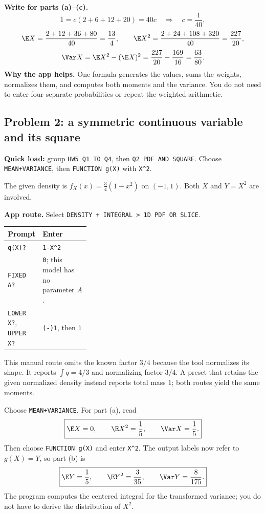 \textbf{Write for parts (a)--(c).}
\[
1=c(2+6+12+20)=40c\quad\Rightarrow\quad c=\frac1{40},
\]
\[
\E X=\frac{2+12+36+80}{40}=\frac{13}{4},\qquad
\E X^2=\frac{2+24+108+320}{40}=\frac{227}{20},
\]
\[
\Var X=\E X^2-(\E X)^2=\frac{227}{20}-\frac{169}{16}=\frac{63}{80}.
\]
\textbf{Why the app helps.} One formula generates the values, sums the weights, normalizes them, and computes both moments and the variance. You do not need to enter four separate probabilities or repeat the weighted arithmetic.

\subsection{Problem 2: a symmetric continuous variable and its square}
\textbf{Quick load:} group \texttt{HW5 Q1 TO Q4}, then \texttt{Q2 PDF AND SQUARE}. Choose \texttt{MEAN+VARIANCE}, then \texttt{FUNCTION g(X)} with \texttt{X\^{}2}.

The given density is $f_X(x)=\frac34(1-x^2)$ on $(-1,1)$. Both $X$ and $Y=X^2$ are involved.

\textbf{App route.} Select \texttt{DENSITY + INTEGRAL > 1D PDF OR SLICE}.
\begin{center}
\begin{tabularx}{\linewidth}{@{}p{0.32\linewidth}X@{}}
\toprule Prompt & Enter\\\midrule
\texttt{q(X)?} & \texttt{1-X\^{}2}\\
\texttt{FIXED A?} & \texttt{0}; this model has no parameter $A$.\\
\texttt{LOWER X?}, \texttt{UPPER X?} & \texttt{(-)1}, then \texttt{1}\\\bottomrule
\end{tabularx}
\end{center}
This manual route omits the known factor $3/4$ because the tool normalizes its shape. It reports $\int q=4/3$ and normalizing factor $3/4$. A preset that retains the given normalized density instead reports total mass 1; both routes yield the same moments.

Choose \texttt{MEAN+VARIANCE}. For part (a), read
\[
\boxed{\E X=0,\qquad \E X^2=\frac15,\qquad \Var X=\frac15.}
\]
Then choose \texttt{FUNCTION g(X)} and enter \texttt{X\^{}2}. The output labels now refer to $g(X)=Y$, so part (b) is
\[
\boxed{\E Y=\frac15,\qquad \E Y^2=\frac3{35},\qquad \Var Y=\frac8{175}.}
\]
The program computes the centered integral for the transformed variance; you do not have to derive the distribution of $X^2$.

